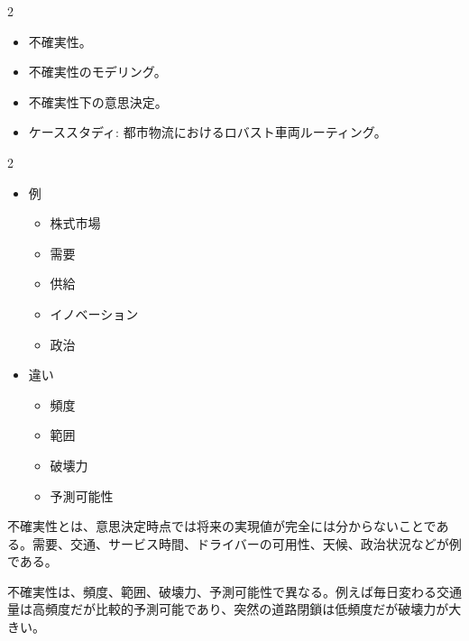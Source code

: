\clearpage
{}
\begin{multicols}{2}\scriptsize\raggedcolumns
{}
\begin{itemize}
\item 不確実性。
\item 不確実性のモデリング。
\item 不確実性下の意思決定。
\item ケーススタディ: 都市物流におけるロバスト車両ルーティング。
\end{itemize}
\end{multicols}

\clearpage
{}
\begin{multicols}{2}\footnotesize\raggedcolumns
{}
\begin{itemize}
\item 例
\begin{itemize}
\item 株式市場
\item 需要
\item 供給
\item イノベーション
\item 政治
\end{itemize}
\item 違い
\begin{itemize}
\item 頻度
\item 範囲
\item 破壊力
\item 予測可能性
\end{itemize}
\end{itemize}
不確実性とは、意思決定時点では将来の実現値が完全には分からないことである。需要、交通、サービス時間、ドライバーの可用性、天候、政治状況などが例である。\par

不確実性は、頻度、範囲、破壊力、予測可能性で異なる。例えば毎日変わる交通量は高頻度だが比較的予測可能であり、突然の道路閉鎖は低頻度だが破壊力が大きい。\par


\end{multicols}
